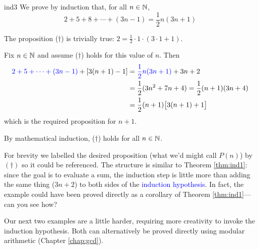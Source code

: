 \begin{example}{}{ind3}
	We prove by induction that, for all $n\in\mathbb{N}$,
	\[
		2+5+8+\cdots+(3n-1)=\frac 12n(3n+1) \tag{$\dag$}
	\]
	\begin{description}\itemsep0pt
		\item[\normalfont\emph{Base case} ($n=1$):] The proposition ($\dag$) is trivially true: $2=\frac 12\cdot 1\cdot(3\cdot 1+1)$.
		\item[\normalfont\emph{Induction Step}:] Fix $n\in\mathbb{N}$ and assume ($\dag$) holds for this value of $n$. Then
		\begin{align*}
			\textcolor{blue}{2+5+\cdots+(3n-1)}+[3(n+1)-1]&=\textcolor{blue}{\frac 12n(3n+1)}+3n+2\\
			&=\frac 12(3n^2+7n+4) =\frac 12(n+1)(3n+4)\\
			&=\frac 12(n+1)\bigl[3(n+1)+1\bigr]
		\end{align*}
		which is the required proposition for $n+1$.
	\end{description}
	By mathematical induction, ($\dag$) holds for all $n\in\mathbb{N}$.
\end{example}

For brevity we labelled the desired proposition (what we'd might call $P(n)$) by $(\dag)$ so it could be referenced. The structure is similar to Theorem \ref{thm:ind1}: since the goal is to evaluate a sum, the induction step is little more than adding the same thing ($3n+2$) to both sides of the \textcolor{blue}{induction hypothesis}. In fact, the example could have been proved directly as a corollary of Theorem \ref{thm:ind1}---can you see how?
\medbreak\goodbreak

Our next two examples are a little harder, requiring more creativity to invoke the induction hypothesis. Both can alternatively be proved directly using modular arithmetic (Chapter \ref{chap:gcd}).

